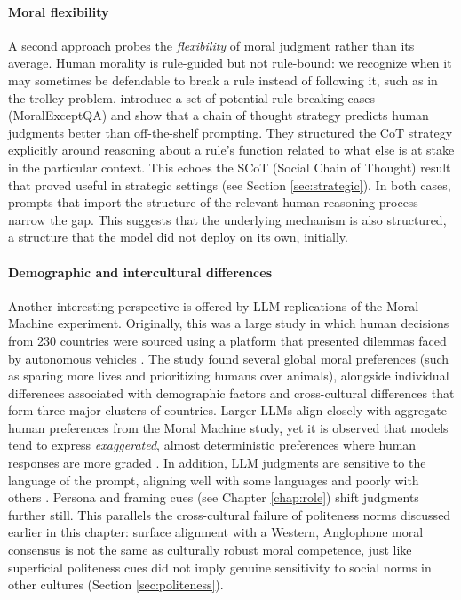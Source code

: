 \paragraph{Moral flexibility} A second approach probes the \emph{flexibility} of moral judgment rather than its average. Human morality is rule-guided but not rule-bound: we recognize when it may sometimes be defendable to break a rule instead of following it, such as in the trolley problem. %
\citet{jin2022make}
introduce a set of potential rule-breaking cases (MoralExceptQA) and show that a chain of thought strategy predicts human judgments better than off-the-shelf prompting. They structured the CoT strategy explicitly around reasoning about a rule's function related to what else is at stake in the particular context. This echoes the SCoT (Social Chain of Thought) result that proved useful in strategic settings (see Section \ref{sec:strategic}). In both cases, prompts that import the structure of the relevant human reasoning process narrow the gap. This suggests that the underlying mechanism is also structured, a structure that the model did not deploy on its own, initially.

\paragraph{Demographic and intercultural differences} Another interesting perspective is offered by LLM replications of the Moral Machine experiment. Originally, this was a large study in which human decisions from 230 countries were sourced using a platform that presented dilemmas faced by autonomous vehicles \citep{awad2018moral}. The study found several global moral preferences (such as sparing more lives and prioritizing humans over animals), alongside individual differences associated with demographic factors and cross-cultural differences that form three major clusters of countries. Larger LLMs align closely with aggregate human preferences from the Moral Machine study, yet it is observed that models tend to express \emph{exaggerated}, almost deterministic preferences where human responses are more graded \citep{takemoto2024moral}. In addition, LLM judgments are sensitive to the language of the prompt, aligning well with some languages and poorly with others \citep{jin2025multilingual}. Persona and framing cues (see Chapter \ref{chap:role}) shift judgments further still. This  parallels the cross-cultural failure of politeness norms discussed earlier in this chapter: surface alignment with a Western, Anglophone moral consensus is not the same as culturally robust moral competence, just like superficial politeness cues did not imply genuine sensitivity to social norms in other cultures (Section \ref{sec:politeness}).

